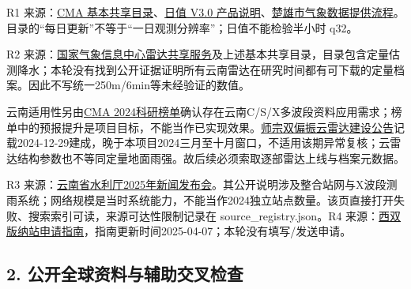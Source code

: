 \documentclass[UTF8,fontset=fandol,10pt]{ctexart}
\begin{document}
R1 来源：\href{https://www.cma.gov.cn/zfxxgk/gknr/wjgk/qtwj/202302/P020230224377864419023.pdf}{CMA 基本共享目录}、\href{https://m.data.cma.cn/data/detail/dataCode/SURF_CLI_CHN_MUL_DAY_V3.0.html}{日值 V3.0 产品说明}、\href{https://www.cxs.gov.cn/info/14045/363408.htm}{楚雄市气象数据提供流程}。目录的“每日更新”不等于“一日观测分辨率”；日值不能检验半小时 q32。

R2 来源：\href{https://k.data.cma.cn/mekb/?r=radar\%2Fdata}{国家气象信息中心雷达共享服务}及上述基本共享目录，目录包含定量估测降水；本轮没有找到公开证据证明所有云南雷达在研究时间都有可下载的定量档案。因此不写统一250m/\allowbreak{}6min等未经验证的数值。

云南适用性另由\href{https://www.cma.gov.cn/kjrh/lmdt/xxfb/202407/P020240704341544390758.pdf}{CMA 2024科研榜单}确认存在云南C/\allowbreak{}S/\allowbreak{}X多波段资料应用需求；榜单中的预报提升是项目目标，不能当作已实现效果。\href{https://www.cma.gov.cn/2011xwzx/2011xqxxw/2011xjctz/202501/t20250102_6771347.html}{师宗双偏振云雷达建设公告}记载2024-12-29建成，晚于本项目2024三月至十月窗口，不适用该期异常复核；云雷达结构参数也不等同定量地面雨强。故后续必须索取逐部雷达上线与档案元数据。

R3 来源：\href{https://wcb.yn.gov.cn/html/2025/xinwenfabuhui_0710/3061514.html}{云南省水利厅2025年新闻发布会}。其公开说明涉及整合站网与X波段测雨系统；网络规模是当时系统能力，不能当作2024独立站点数量。该页直接打开失败、搜索索引可读，来源可达性限制记录在 source\_\allowbreak{}registry.json。R4 来源：\href{https://bnf.cern.ac.cn/content?id=54395}{西双版纳站申请指南}，指南更新时间2025-04-07；本轮没有填写/\allowbreak{}发送申请。

\subsection{2. 公开全球资料与辅助交叉检查}
\end{document}
